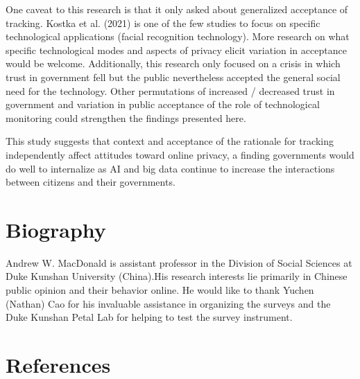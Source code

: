 \documentclass[
  letterpaper,
  DIV=11,
  numbers=noendperiod]{scrartcl}
\begin{document}
One caveat to this research is that it only asked about generalized
acceptance of tracking. Kostka et al. (2021) is one of the few studies
to focus on specific technological applications (facial recognition
technology). More research on what specific technological modes and
aspects of privacy elicit variation in acceptance would be welcome.
Additionally, this research only focused on a crisis in which trust in
government fell but the public nevertheless accepted the general social
need for the technology. Other permutations of increased / decreased
trust in government and variation in public acceptance of the role of
technological monitoring could strengthen the findings presented here.

This study suggests that context and acceptance of the rationale for
tracking independently affect attitudes toward online privacy, a finding
governments would do well to internalize as AI and big data continue to
increase the interactions between citizens and their governments.

\newpage{}

\section{Biography}\label{biography}

Andrew W. MacDonald is assistant professor in the Division of Social
Sciences at Duke Kunshan University (China).His research interests lie
primarily in Chinese public opinion and their behavior online. He would
like to thank Yuchen (Nathan) Cao for his invaluable assistance in
organizing the surveys and the Duke Kunshan Petal Lab for helping to
test the survey instrument.

\newpage{}

\section{References}\label{references}
\end{document}
